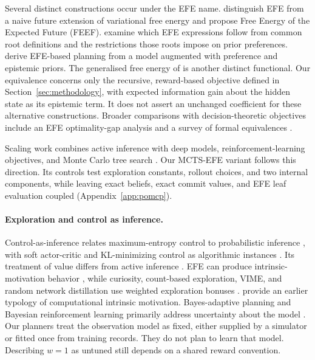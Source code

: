 \documentclass[manuscript, screen, review]{jair}
\begin{document}
Several distinct constructions occur under the EFE name. \citet{millidge2021} distinguish EFE from a naive future extension of variational free energy and propose Free Energy of the Expected Future (FEEF). \citet{champion2024} examine which EFE expressions follow from common root definitions and the restrictions those roots impose on prior preferences. \citet{devries2025} derive EFE-based planning from a model augmented with preference and epistemic priors. The generalised free energy of \citet{parr2019} is another distinct functional. Our equivalence concerns only the recursive, reward-based objective defined in Section~\ref{sec:methodology}, with expected information gain about the hidden state as its epistemic term. It does not assert an unchanged coefficient for these alternative constructions. Broader comparisons with decision-theoretic objectives include an EFE optimality-gap analysis \citep{wei2024voi} and a survey of formal equivalences \citep{sweeney2026equivalences}.

Scaling work combines active inference with deep models, reinforcement-learning objectives, and Monte Carlo tree search \citep{fountas2020,tschantz2020,maisto2025}. Our MCTS-EFE variant follows this direction. Its controls test exploration constants, rollout choices, and two internal components, while leaving exact beliefs, exact commit values, and EFE leaf evaluation coupled (Appendix~\ref{app:pomcp}).

\paragraph{Exploration and control as inference.}
Control-as-inference relates maximum-entropy control to probabilistic inference \citep{todorov2007,levine2018}, with soft actor-critic and KL-minimizing control as algorithmic instances \citep{haarnoja2018,rawlik2012}. Its treatment of value differs from active inference \citep{millidge2020}. EFE can produce intrinsic-motivation behavior \citep{sajid2021}, while curiosity, count-based exploration, VIME, and random network distillation use weighted exploration bonuses \citep{schmidhuber1991,pathak2017,bellemare2016,houthooft2016,burda2019}. \citet{oudeyer2007} provide an earlier typology of computational intrinsic motivation. Bayes-adaptive planning and Bayesian reinforcement learning primarily address uncertainty about the model \citep{duff2002,guez2013,ghavamzadeh2015}. Our planners treat the observation model as fixed, either supplied by a simulator or fitted once from training records. They do not plan to learn that model. Describing $w=1$ as untuned still depends on a shared reward convention.
\end{document}
